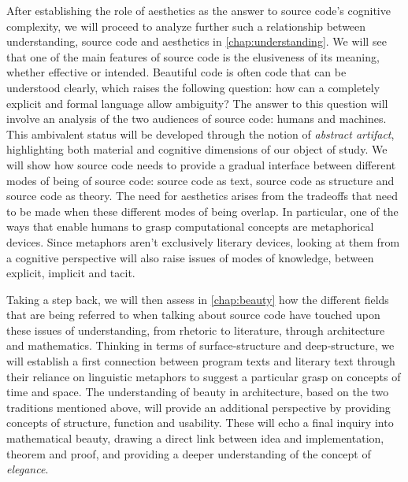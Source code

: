 After establishing the role of aesthetics as the answer to source code's cognitive complexity, we will proceed to analyze further such a relationship between understanding, source code and aesthetics in \ref{chap:understanding}. We will see that one of the main features of source code is the elusiveness of its meaning, whether effective or intended. Beautiful code is often code that can be understood clearly, which raises the following question: how can a completely explicit and formal language allow ambiguity? The answer to this question will involve an analysis of the two audiences of source code: humans and machines. This ambivalent status will be developed through the notion of \emph{abstract artifact}, highlighting both material and cognitive dimensions of our object of study. We will show how source code needs to provide a gradual interface between different modes of being of source code: source code as text, source code as structure and source code as theory. The need for aesthetics arises from the tradeoffs that need to be made when these different modes of being overlap. In particular, one of the ways that enable humans to grasp computational concepts are metaphorical devices. Since metaphors aren't exclusively literary devices, looking at them from a cognitive perspective will also raise issues of modes of knowledge, between explicit, implicit and tacit.

Taking a step back, we will then assess in \ref{chap:beauty} how the different fields that are being referred to when talking about source code have touched upon these issues of understanding, from rhetoric to literature, through architecture and mathematics. Thinking in terms of surface-structure and deep-structure, we will establish a first connection between program texts and literary text through their reliance on linguistic metaphors to suggest a particular grasp on concepts of time and space. The understanding of beauty in architecture, based on the two traditions mentioned above, will provide an additional perspective by providing concepts of structure, function and usability. These will echo a final inquiry into mathematical beauty, drawing a direct link between idea and implementation, theorem and proof, and providing a deeper understanding of the concept of \emph{elegance}.

